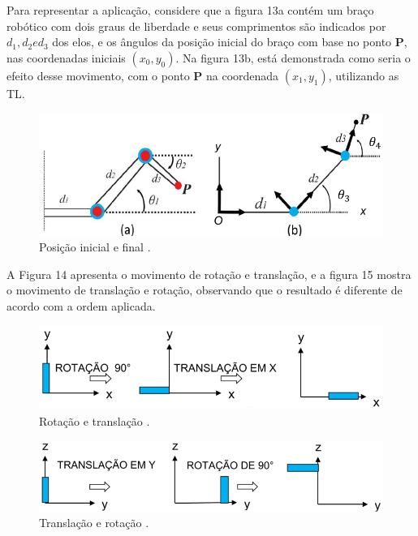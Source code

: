 Para representar a aplicação, considere que a figura 13a contém um braço robótico com dois graus de liberdade e seus comprimentos são indicados por $d_1, d_2 e d_3$ dos elos, e os ângulos da posição inicial do braço com base no ponto $\mathbf{P}$, nas coordenadas iniciais $(x_0, y_0)$. Na figura 13b, está demonstrada como seria o efeito desse movimento, com o ponto $\mathbf{P}$ na coordenada $(x_1, y_1)$, utilizando as TL.

\begin{figure}[H]
	\centering
	\includegraphics[scale=0.70]{a_robo2.png}
	\caption{Posição inicial e final \cite{sirlandro2017}.}
\end{figure} 

A Figura 14 apresenta o movimento de rotação e translação, e a figura 15 mostra o movimento de translação e rotação, observando que o resultado é diferente de acordo com a ordem aplicada.

\begin{figure}[H]
	\centering
	\includegraphics[scale=0.80]{a_robo3.png}
	\caption{Rotação e translação \cite{sirlandro2017}.}
\end{figure} 

\begin{figure}[H]
	\centering
	\includegraphics[scale=0.80]{a_robo4.png}
	\caption{Translação e rotação \cite{sirlandro2017}.}
\end{figure} 

